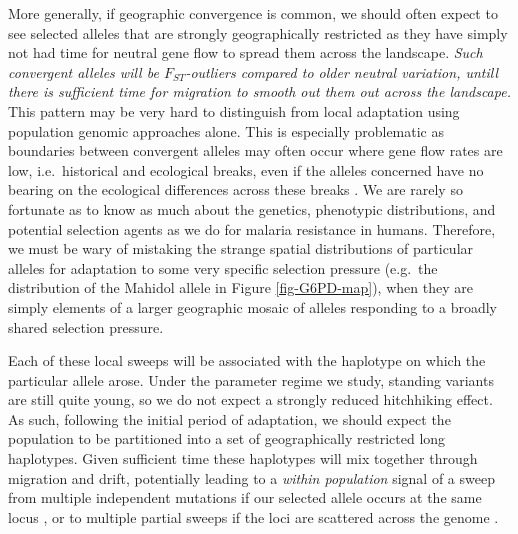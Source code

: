\documentclass{article}
\newcommand{\gc}[1]{{\it\color{blue}#1}}
\newcommand{\mfp}[1]{{\it\color{red}#1}}
\begin{document}
More generally, if geographic convergence is common, we should often expect to see
selected alleles that are strongly geographically restricted as they
have simply not had time for neutral gene flow to spread them across the
landscape. \gc{Such convergent alleles will be $F_{ST}$-outliers compared to
  older neutral variation, untill there is sufficient time for
  migration to smooth out them out across the landscape.}
This pattern may be very hard to distinguish from local adaptation using population genomic approaches
alone. This is especially problematic as boundaries between convergent alleles may often
occur where gene flow rates are low, i.e.\ historical and ecological breaks, even if
the alleles concerned have no bearing on the ecological differences
across these breaks \citep[see][for a wide-ranging discussion of how allelic differentiation may build along particular zones]{bierne2011coupling}. 
We are rarely so fortunate as to know as much about the genetics, phenotypic distributions, 
and potential selection agents as we do for malaria resistance in humans. 
Therefore, we must be wary of mistaking the strange spatial distributions of particular alleles 
for adaptation to some very specific selection pressure (e.g.\ the distribution of the Mahidol allele in Figure \ref{fig-G6PD-map}), 
when they are simply elements of a larger geographic mosaic of alleles responding to a broadly shared selection pressure. 


Each of these local sweeps will be associated with the haplotype on which the particular allele arose. 
Under the parameter regime we study,
standing variants are still quite young, 
so we do not expect a strongly reduced hitchhiking effect. 
As such, following the initial period of
adaptation, we should expect the population to be partitioned into a
set of geographically restricted long haplotypes. 
Given sufficient time these haplotypes will mix together through
migration and drift, 
potentially leading to a \mfp{within population} signal of a sweep from multiple independent
mutations if our selected allele occurs at the same locus \citep{softsweepsIII}, 
or to multiple partial sweeps if the loci are scattered across the
genome \citep{CoopRalph:12}.
\end{document}
